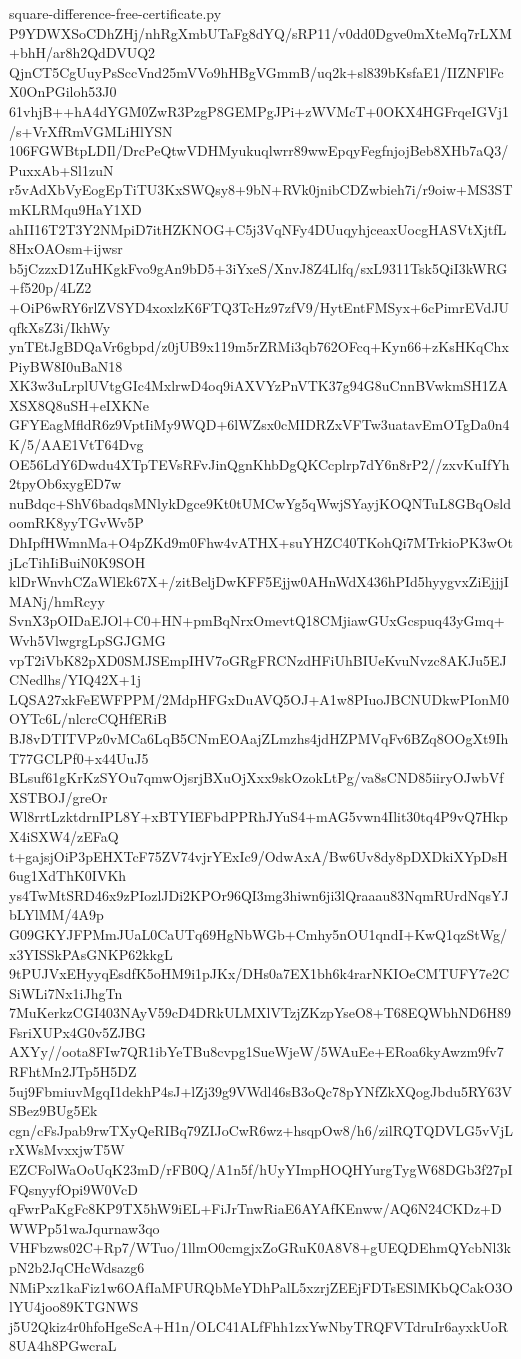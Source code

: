 \documentclass[11pt]{article}
\theoremstyle{definition}
\theoremstyle{remark}
\begin{document}
\begin{filecontents*}[overwrite]{square-difference-free-certificate.py}
P9YDWXSoCDhZHj/nhRgXmbUTaFg8dYQ/sRP11/v0dd0Dgve0mXteMq7rLXM+bhH/ar8h2QdDVUQ2
QjnCT5CgUuyPsSccVnd25mVVo9hHBgVGmmB/uq2k+sl839bKsfaE1/IIZNFlFcX0OnPGiloh53J0
61vhjB++hA4dYGM0ZwR3PzgP8GEMPgJPi+zWVMcT+0OKX4HGFrqeIGVj1/s+VrXfRmVGMLiHlYSN
106FGWBtpLDIl/DrcPeQtwVDHMyukuqlwrr89wwEpqyFegfnjojBeb8XHb7aQ3/PuxxAb+Sl1zuN
r5vAdXbVyEogEpTiTU3KxSWQsy8+9bN+RVk0jnibCDZwbieh7i/r9oiw+MS3STmKLRMqu9HaY1XD
ahII16T2T3Y2NMpiD7itHZKNOG+C5j3VqNFy4DUuqyhjceaxUocgHASVtXjtfL8HxOAOsm+ijwsr
b5jCzzxD1ZuHKgkFvo9gAn9bD5+3iYxeS/XnvJ8Z4Llfq/sxL9311Tsk5QiI3kWRG+f520p/4LZ2
+OiP6wRY6rlZVSYD4xoxlzK6FTQ3TcHz97zfV9/HytEntFMSyx+6cPimrEVdJUqfkXsZ3i/IkhWy
ynTEtJgBDQaVr6gbpd/z0jUB9x119m5rZRMi3qb762OFcq+Kyn66+zKsHKqChxPiyBW8I0uBaN18
XK3w3uLrplUVtgGIc4MxlrwD4oq9iAXVYzPnVTK37g94G8uCnnBVwkmSH1ZAXSX8Q8uSH+eIXKNe
GFYEagMfldR6z9VptIiMy9WQD+6lWZsx0cMIDRZxVFTw3uatavEmOTgDa0n4K/5/AAE1VtT64Dvg
OE56LdY6Dwdu4XTpTEVsRFvJinQgnKhbDgQKCcplrp7dY6n8rP2//zxvKuIfYh2tpyOb6xygED7w
nuBdqc+ShV6badqsMNlykDgce9Kt0tUMCwYg5qWwjSYayjKOQNTuL8GBqOsldoomRK8yyTGvWv5P
DhIpfHWmnMa+O4pZKd9m0Fhw4vATHX+suYHZC40TKohQi7MTrkioPK3wOtjLcTihIiBuiN0K9SOH
klDrWnvhCZaWlEk67X+/zitBeljDwKFF5Ejjw0AHnWdX436hPId5hyygvxZiEjjjIMANj/hmRcyy
SvnX3pOIDaEJOl+C0+HN+pmBqNrxOmevtQ18CMjiawGUxGcspuq43yGmq+Wvh5VlwgrgLpSGJGMG
vpT2iVbK82pXD0SMJSEmpIHV7oGRgFRCNzdHFiUhBIUeKvuNvzc8AKJu5EJCNedlhs/YIQ42X+1j
LQSA27xkFeEWFPPM/2MdpHFGxDuAVQ5OJ+A1w8PIuoJBCNUDkwPIonM0OYTc6L/nlcrcCQHfERiB
BJ8vDTITVPz0vMCa6LqB5CNmEOAajZLmzhs4jdHZPMVqFv6BZq8OOgXt9IhT77GCLPf0+x44UuJ5
BLsuf61gKrKzSYOu7qmwOjsrjBXuOjXxx9skOzokLtPg/va8sCND85iiryOJwbVfXSTBOJ/greOr
Wl8rrtLzktdrnIPL8Y+xBTYIEFbdPPRhJYuS4+mAG5vwn4Ilit30tq4P9vQ7HkpX4iSXW4/zEFaQ
t+gajsjOiP3pEHXTcF75ZV74vjrYExIc9/OdwAxA/Bw6Uv8dy8pDXDkiXYpDsH6ug1XdThK0IVKh
ys4TwMtSRD46x9zPIozlJDi2KPOr96QI3mg3hiwn6ji3lQraaau83NqmRUrdNqsYJbLYlMM/4A9p
G09GKYJFPMmJUaL0CaUTq69HgNbWGb+Cmhy5nOU1qndI+KwQ1qzStWg/x3YISSkPAsGNKP62kkgL
9tPUJVxEHyyqEsdfK5oHM9i1pJKx/DHs0a7EX1bh6k4rarNKIOeCMTUFY7e2CSiWLi7Nx1iJhgTn
7MuKerkzCGI403NAyV59cD4DRkULMXlVTzjZKzpYseO8+T68EQWbhND6H89FsriXUPx4G0v5ZJBG
AXYy//oota8FIw7QR1ibYeTBu8cvpg1SueWjeW/5WAuEe+ERoa6kyAwzm9fv7RFhtMn2JTp5H5DZ
5uj9FbmiuvMgqI1dekhP4sJ+lZj39g9VWdl46sB3oQc78pYNfZkXQogJbdu5RY63VSBez9BUg5Ek
cgn/cFsJpab9rwTXyQeRIBq79ZIJoCwR6wz+hsqpOw8/h6/zilRQTQDVLG5vVjLrXWsMvxxjwT5W
EZCFolWaOoUqK23mD/rFB0Q/A1n5f/hUyYImpHOQHYurgTygW68DGb3f27pIFQsnyyfOpi9W0VcD
qFwrPaKgFc8KP9TX5hW9iEL+FiJrTnwRiaE6AYAfKEnww/AQ6N24CKDz+DWWPp51waJqurnaw3qo
VHFbzws02C+Rp7/WTuo/1llmO0cmgjxZoGRuK0A8V8+gUEQDEhmQYcbNl3kpN2b2JqCHcWdsazg6
NMiPxz1kaFiz1w6OAfIaMFURQbMeYDhPalL5xzrjZEEjFDTsESlMKbQCakO3OlYU4joo89KTGNWS
j5U2Qkiz4r0hfoHgeScA+H1n/OLC41ALfFhh1zxYwNbyTRQFVTdruIr6ayxkUoR8UA4h8PGwcraL

\end{filecontents*}
\end{document}
